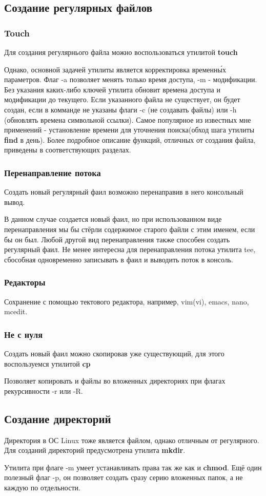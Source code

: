 \documentclass[a4paper]{article}
\begin{document}
\subsection{Создание регулярных файлов}
\subsubsection{Touch}
Для создания регулярнього файла можно воспользоваться утилитой \textbf{touch}

Однако, основной задачей утилиты является корректировка временн\'{ы}х параметров. Флаг -a позволяет менять только время доступа, -m - модификации. Без указания каких-либо ключей утилита обновит времена доступа и модификации до текущего.
Если указанного файла не существует, он будет создан, если в комманде не указаны флаги -c (не создавать файлы) или -h (обновлять времена символьной ссылки).
Самое популярное из известных мне применений - установление времени для уточнения поиска(обход шага утилиты \textbf{find} в день). Более подробное описание функций, отличных от создания файла, приведены в соответствующих разделах.
\subsubsection{Перенаправление потока}
Создать новый регулярный фаил возможно перенаправив в него консольный вывод.

В данном случае создается новый фаил, но при использованном виде перенаправления мы бы стёрли содержимое старого файли с этим именем, если бы он был. Любой другой вид перенаправления также способен создать регулярный фаил. Не менее интересна для перенаправления потока утилита tee, сбособная одновременно записывать в фаил и выводить поток в консоль.
\subsubsection{ Редакторы}
Сохранение с помощью тектового редактора, например, vim(vi), emacs, nano, mcedit.
\subsubsection{ Не с нуля}
\label{subsec:not_null}
Создать новый фаил можно скопировав уже существующий, для этого воспользуемся утилитой \textbf{cp}

Позволяет копировать и файлы во вложенных директориях при флагах рекурсивности -r или -R.
\subsection{Создание директорий}
Директория в ОС Linux тоже является файлом, однако отличным от регулярного.
Для созданий директорий предусмотрена утилита \textbf{mkdir}.

Утилита при флаге -m умеет устанавливать права так же как и \textbf{chmod}. Ещё один полезный флаг -p, он позволяет создать сразу серию вложенных папок, а не каждую по отдельности.
\end{document}
